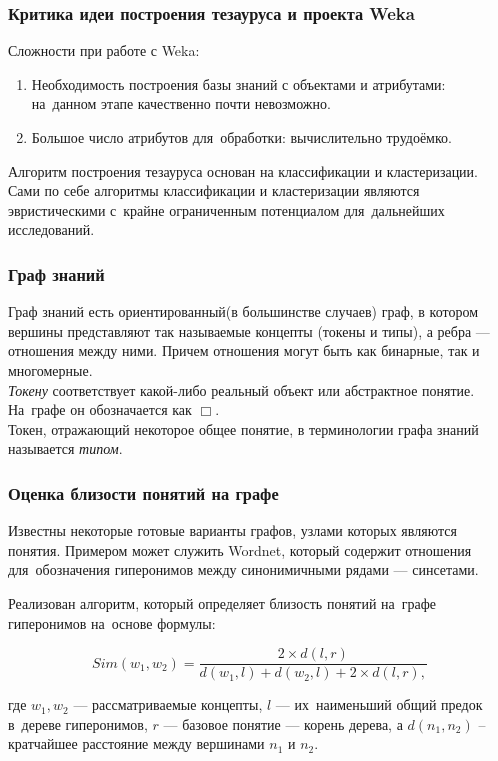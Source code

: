 \documentclass{beamer}
\begin{document}
\begin{frame}
\frametitle{Критика идеи построения тезауруса и проекта Weka}

Сложности при работе с Weka:
\begin{enumerate}
\item{Необходимость построения базы знаний  с объектами и атрибутами: на~данном этапе качественно почти невозможно.}
\item{Большое число атрибутов для~обработки: вычислительно трудоёмко.}
\end{enumerate}

Алгоритм построения тезауруса основан на классификации и кластеризации.
Сами по себе алгоритмы классификации и кластеризации являются эвристическими с~крайне ограниченным потенциалом для~дальнейших исследований.

\end{frame}

\begin{frame}
\frametitle{Граф знаний}
Граф знаний есть ориентированный(в большинстве случаев) граф, в котором вершины представляют так называемые концепты (токены и типы),
а ребра --- отношения между ними.
Причем отношения могут быть как бинарные, так и многомерные.\\ 

\textsl{Токену} соответствует какой-либо реальный объект или абстрактное понятие.
 На~графе он обозначается как $\Box$. \\

Токен, отражающий некоторое общее понятие, в терминологии графа знаний называется \textsl{типом}.\\
\end{frame}

\begin{frame}
\frametitle{Оценка близости понятий на графе}

Известны некоторые готовые варианты графов, узлами которых являются понятия.
Примером может служить Wordnet, который содержит отношения для~обозначения гиперонимов 
между синонимичными рядами --- синсетами.

Реализован алгоритм, который определяет близость понятий на~графе гиперонимов на~основе формулы:

$$ Sim(w_1, w_2) = \frac{ 2\times d(l, r) }
	               { d(w_1, l) + d(w_2, l) + 2\times d(l,r), }$$

где $w_1,w_2$ --- рассматриваемые концепты, 
$l$ --- их~наименьший общий предок в~дереве гиперонимов,
$r$ --- базовое понятие --- корень дерева, 
а $d(n_1,n_2)$ -- 
кратчайшее расстояние между вершинами $n_1$ и $n_2$.

\end{frame}
\end{document}

